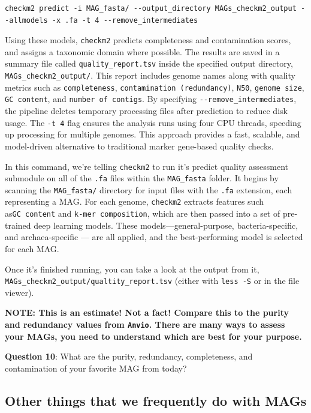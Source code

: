 \documentclass[
]{book}
\begin{document}
\begin{verbatim}
checkm2 predict -i MAG_fasta/ --output_directory MAGs_checkm2_output --allmodels -x .fa -t 4 --remove_intermediates
\end{verbatim}

Using these models, \texttt{checkm2} predicts completeness and contamination scores, and assigns a taxonomic domain where possible. The results are saved in a summary file called \texttt{quality\_report.tsv} inside the specified output directory, \texttt{MAGs\_checkm2\_output/}. This report includes genome names along with quality metrics such as \texttt{completeness}, \texttt{contamination\ (redundancy)}, \texttt{N50}, \texttt{genome\ size}, \texttt{GC\ content}, and \texttt{number\ of\ contigs}. By specifying \texttt{-\/-remove\_intermediates}, the pipeline deletes temporary processing files after prediction to reduce disk usage. The \texttt{-t\ 4} flag ensures the analysis runs using four CPU threads, speeding up processing for multiple genomes. This approach provides a fast, scalable, and model-driven alternative to traditional marker gene-based quality checks.

In this command, we're telling \texttt{checkm2} to run it's predict quality assessment submodule on all of the \texttt{.fa} files within the \texttt{MAG\_fasta} folder. It begins by scanning the \texttt{MAG\_fasta/} directory for input files with the \texttt{.fa} extension, each representing a MAG. For each genome, \texttt{checkm2} extracts features such as\texttt{GC\ content} and \texttt{k-mer\ composition}, which are then passed into a set of pre-trained deep learning models. These models---general-purpose, bacteria-specific, and archaea-specific --- are all applied, and the best-performing model is selected for each MAG.

Once it's finished running, you can take a look at the output from it, \texttt{MAGs\_checkm2\_output/qualtity\_report.tsv} (either with \texttt{less\ -S} or in the file viewer).

\textbf{NOTE: This is an estimate! Not a fact! Compare this to the purity and redundancy values from \texttt{Anvi\textquotesingle{}o}. There are many ways to assess your MAGs, you need to understand which are best for your purpose.}

\textbf{Question 10}: What are the purity, redundancy, completeness, and contamination of your favorite MAG from today?

\subsection{Other things that we frequently do with MAGs}\label{other-things-that-we-frequently-do-with-mags}
\end{document}
